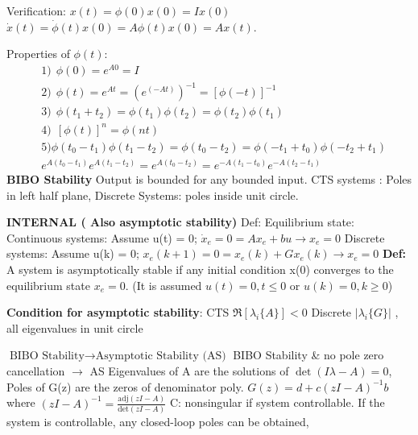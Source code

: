 \begin{multicols*}{3}
Verification: $x(t)=\phi(0)x(0)=Ix(0)$ 
$\dot{x}(t)=\dot{\phi}(t)x(0)=A\phi(t)x(0)=Ax(t)$. 

Properties of $\phi(t)$:
\vspace*{-0.4cm}
\begin{align*}
& 1) \ \ \phi(0)=e^{A0}=I \\
& 2) \ \ \phi(t) = e^{At} = (e^{(-At)})^{-1}=[\phi(-t)]^{-1} \\
& 3) \ \ \phi(t_1+t_2)=\phi(t_1)\phi(t_2)=\phi(t_2)\phi(t_1) \\
& 4) \ \ [\phi(t)]^n = \phi(nt) \\
& 5) \phi(t_0-t_1)\phi(t_1-t_2)=\phi(t_0-t_2)=\phi(-t_1+t_0)\phi(-t_2+t_1) \\
& e^{A(t_0-t_1)}e^{A(t_1-t_2)} = e^{A(t_0-t_2)}=e^{-A(t_1-t_0)}e^{-A(t_2-t_1)}
\end{align*}%
%
\textbf{BIBO Stability}
Output is bounded for any bounded input.
CTS systems : Poles in left half plane, Discrete Systems: poles inside unit circle.

\textbf{INTERNAL ( Also asymptotic stability)}
Def: Equilibrium state:
 Continuous systems: Assume u(t) = 0;
 $\dot{x}_e=0=Ax_e+bu \rightarrow x_e=0$ \hfill \break 
  Discrete systems: Assume u(k) = 0;
 $x_e(k+1)=0=x_e(k)+Gx_e(k) \rightarrow x_e=0$ \hfill \break
\textbf{Def:} A system is asymptotically stable if any initial condition x(0) converges to
the equilibrium state $x_e=0$.
 (It is assumed $u(t) = 0,t \leq0$  or $u(k)=0, k\geq 0$)
 
 \textbf{Condition for asymptotic stability}: \hfill \break CTS $\Re[\lambda_i\{A\}]<0$ \hfill \break Discrete $|\lambda_i 
 \{G\}|$
, all eigenvalues in unit circle

$\text{BIBO Stability} \rightarrow \text{Asymptotic Stability (AS)}$ \hfill \break
BIBO Stability \& no pole zero cancellation $\rightarrow $ AS \hfill \break 
%
Eigenvalues of A are the solutions of $\det(I\lambda -A) = 0$, \hfill \break
Poles of G(z) are the zeros of denominator poly. 
$G(z)=d+c(zI-A)^{-1}b$ where $(zI-A)^{-1}=\frac{\text{adj}(zI-A)}{\text{det}(zI-A)}$
C: nonsingular if system controllable. If the system is controllable,
any closed-loop poles can be obtained, %


\end{multicols*}
